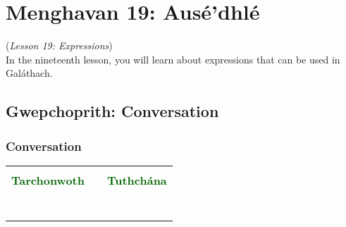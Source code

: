\section{Menghavan 19: Aus\'{e'}dhl\'{e}}
(\textit{Lesson 19: Expressions})\\

In the nineteenth lesson, you will learn about expressions that can be used in Gal\'{a}thach.

\subsection{Gwepchoprith: Conversation}
\subsubsection{Conversation}

\begin{table}[H]
\centering
    \begin{tabular}{cM{10.0cm}c}
     &  & \\
    \textcolor{darkgreen}{\textbf{Tarchonwoth}} &  & \textcolor{darkgreen}{\textbf{Tuthch\'{a}na}}\\
     &  & \\
     &  & \\
     &  & \\
     &  & \\
     &  & \\
     &  & \\
     &  & 
    \end{tabular}
\end{table}


